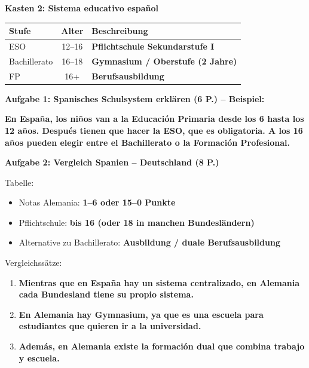 \documentclass[11pt,a4paper]{article}
\newcommand{\lsg}[1]{\textcolor{loesung}{\textbf{#1}}}
\begin{document}
\begin{gruppeBbox}

\textbf{Kasten 2: Sistema educativo español}

\begin{tabularx}{\textwidth}{@{}|p{4cm}|c|X|@{}}
\hline
\textbf{Stufe} & \textbf{Alter} & \textbf{Beschreibung} \\
\hline
ESO & 12--16 & \lsg{Pflichtschule Sekundarstufe I} \\
\hline
Bachillerato & 16--18 & \lsg{Gymnasium / Oberstufe (2 Jahre)} \\
\hline
FP & 16+ & \lsg{Berufsausbildung} \\
\hline
\end{tabularx}

\vspace{0.8em}

\textbf{Aufgabe 1: Spanisches Schulsystem erklären (6 P.) -- Beispiel:}

\lsg{En España, los niños van a la Educación Primaria desde los 6 hasta los 12 años. Después tienen que hacer la ESO, que es obligatoria. A los 16 años pueden elegir entre el Bachillerato o la Formación Profesional.}

\vspace{0.5em}

\textbf{Aufgabe 2: Vergleich Spanien -- Deutschland (8 P.)}

Tabelle:
\begin{itemize}[leftmargin=1.5em, nosep]
    \item Notas Alemania: \lsg{1--6 oder 15--0 Punkte}
    \item Pflichtschule: \lsg{bis 16 (oder 18 in manchen Bundesländern)}
    \item Alternative zu Bachillerato: \lsg{Ausbildung / duale Berufsausbildung}
\end{itemize}

Vergleichssätze:
\begin{enumerate}[leftmargin=2em, nosep]
    \item \lsg{Mientras que en España hay un sistema centralizado, en Alemania cada Bundesland tiene su propio sistema.}
    \item \lsg{En Alemania hay Gymnasium, ya que es una escuela para estudiantes que quieren ir a la universidad.}
    \item \lsg{Además, en Alemania existe la formación dual que combina trabajo y escuela.}
\end{enumerate}


\end{gruppeBbox}
\end{document}
